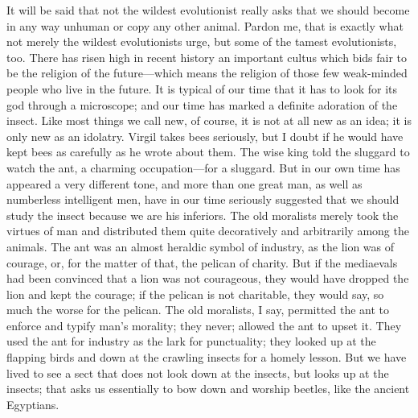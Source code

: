 \documentclass{book}
\begin{document}
It will be said that not the wildest evolutionist really asks that we should become in any way unhuman or copy any other animal. Pardon me, that is exactly what not merely the wildest evolutionists urge, but some of the tamest evolutionists, too. There has risen high in recent history an important cultus which bids fair to be the religion of the future—which means the religion of those few weak-minded people who live in the future. It is typical of our time that it has to look for its god through a microscope; and our time has marked a definite adoration of the insect. Like most things we call new, of course, it is not at all new as an idea; it is only new as an idolatry. Virgil takes bees seriously, but I doubt if he would have kept bees as carefully as he wrote about them. The wise king told the sluggard to watch the ant, a charming occupation—for a sluggard. But in our own time has appeared a very different tone, and more than one great man, as well as numberless intelligent men, have in our time seriously suggested that we should study the insect because we are his inferiors. The old moralists merely took the virtues of man and distributed them quite decoratively and arbitrarily among the animals. The ant was an almost heraldic symbol of industry, as the lion was of courage, or, for the matter of that, the pelican of charity. But if the mediaevals had been convinced that a lion was not courageous, they would have dropped the lion and kept the courage; if the pelican is not charitable, they would say, so much the worse for the pelican. The old moralists, I say, permitted the ant to enforce and typify man’s morality; they never; allowed the ant to upset it. They used the ant for industry as the lark for punctuality; they looked up at the flapping birds and down at the crawling insects for a homely lesson. But we have lived to see a sect that does not look down at the insects, but looks up at the insects; that asks us essentially to bow down and worship beetles, like the ancient Egyptians.
\end{document}
